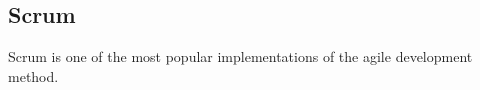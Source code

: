 \subsection{Scrum} \label{sec:scrum} 
Scrum is one of the most popular implementations of the agile development method.

\begin{definition} \label{def:scrum_master} 

\end{definition}

\begin{definition}[Sprint] \label{def:sprint} 

\end{definition}

\begin{definition} \label{def:sprint_backlog} 

\end{definition}

\begin{definition} \label{def:daily_scrum} 

\end{definition}

\begin{definition}  \label{def:sprint_review} 

\end{definition}
